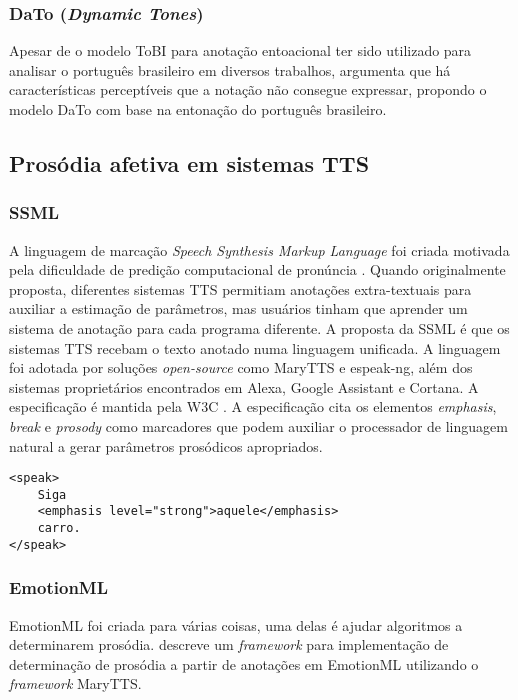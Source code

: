 \subsubsection{DaTo (\emph{Dynamic Tones})}
Apesar de o modelo ToBI para anotação entoacional ter sido utilizado para analisar o
português brasileiro em diversos trabalhos,  argumenta que
há características perceptíveis que a notação não consegue expressar, propondo o
modelo DaTo com base na entonação do português brasileiro.

\subsection{Prosódia afetiva em sistemas TTS}
\label{prosafe}
\subsubsection{SSML}
A linguagem de marcação \emph{Speech Synthesis Markup Language} foi criada
motivada pela dificuldade de predição computacional de pronúncia
\cite{ssmlpaper}. Quando originalmente proposta, diferentes sistemas TTS
permitiam anotações extra-textuais para auxiliar a estimação de parâmetros, mas
usuários tinham que aprender um sistema de anotação para cada programa
diferente. A proposta da SSML é que os sistemas TTS recebam o texto anotado numa
linguagem unificada. A linguagem foi adotada por soluções \emph{open-source}
como MaryTTS e espeak-ng, além dos sistemas proprietários encontrados em Alexa,
Google Assistant e Cortana. A especificação é mantida pela W3C \cite{ssml}.
A especificação cita os elementos \emph{emphasis}, \emph{break} e \emph{prosody}
como marcadores que podem auxiliar o processador de linguagem natural a gerar
parâmetros prosódicos apropriados.

\begin{lstlisting}[caption=Exemplo de texto anotado com SSML]
<speak>
    Siga
    <emphasis level="strong">aquele</emphasis> 
    carro.
</speak> 
\end{lstlisting}

\subsubsection{EmotionML}
EmotionML \cite{emotionml} foi criada para várias coisas, uma delas é ajudar
algoritmos a determinarem prosódia. \cite{emotionmary} descreve um
\emph{framework} para implementação de determinação de prosódia a partir de
anotações em EmotionML utilizando o \emph{framework} MaryTTS.

